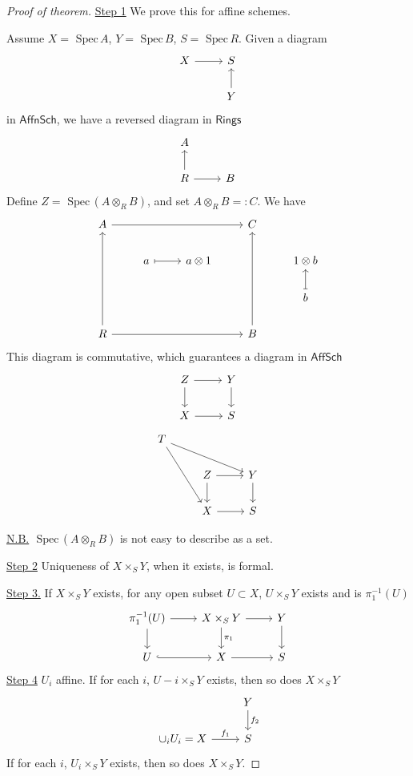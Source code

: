 \documentclass[11pt]{article}
\newcommand{\spec}{\text{ Spec}\,}
\begin{document}
\begin{proof}[Proof of theorem]
\underline{Step 1} We prove this for affine schemes.

Assume $X=\spec A$, $Y=\spec B$, $S=\spec R$. Given  a diagram
$$
\begin{tikzcd}
X \arrow[r] & S \\
 & Y \arrow[u]
\end{tikzcd}
$$
in $\mathsf{AffnSch}$, we have a reversed diagram in $\mathsf{Rings}$
$$
\begin{tikzcd}
A &  \\
R \arrow[u] \arrow[r] & B
\end{tikzcd}
$$
Define $Z=\spec(A\otimes_R B)$, and set $A\otimes_R B=:C$. We have 
$$
\begin{tikzcd}
A \arrow[rrr] &  &  & C &  \\
 & a \arrow[r, maps to] & a\otimes 1 &  & 1\otimes b \\
 &  &  &  & b \arrow[u, maps to] \\
R \arrow[uuu] \arrow[rrr] &  &  & B \arrow[uuu] & 
\end{tikzcd}
$$
This diagram is commutative, which guarantees a diagram in $\mathsf{AffSch}$ 
$$
\begin{tikzcd}
Z \arrow[r] \arrow[d] & Y \arrow[d] \\
X \arrow[r] & S
\end{tikzcd}
$$
$$
\begin{tikzcd}
T \arrow[rdd] \arrow[rrd] &  &  \\
 & Z \arrow[d] \arrow[r] & Y \arrow[d] \\
 & X \arrow[r] & S
\end{tikzcd}
$$

\underline{N.B.} $\spec (A\otimes_R B)$ is not easy to describe as a set.


\underline{Step 2} Uniqueness of $X\times_S Y$, when it  exists, is formal.

\underline{Step 3.} If $X\times_S Y$ exists, for any open subset $U\subset X$, $U\times_S Y$ exists and is $\pi_1^{-1}(U)$
$$
\begin{tikzcd}
\pi_1^{-1}(U) \arrow[d] \arrow[r] & X\times_S Y \arrow[d, "\pi_1"] \arrow[r] & Y \arrow[d] \\
U \arrow[r, hook] & X \arrow[r] & S
\end{tikzcd}
$$
\underline{Step 4} $U_i$ affine. If for each $i$, $U-i\times_S Y$ exists, then so does $X\times_S Y$
$$
\begin{tikzcd}
 & Y \arrow[d, "f_2"] \\
\cup_i U_i=X \arrow[r, "f_1"] & S
\end{tikzcd}
$$
If for each $i$, $U_i\times_S Y$ exists, then so does $X\times_S Y$.


\end{proof}
\end{document}
